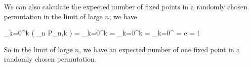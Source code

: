 We can also calculate the expected number of fixed points in a randomly chosen permutation in the limit of large $n$; we have

\bee
\sum_{k=0}^\infty k \left( \lim_{n \rightarrow \infty} P_{n,k} \right) = \sum_{k=0}^\infty k  =  \sum_{k=0}^\infty k  =  \sum_{k=0}^\infty {} =  e = 1
\eee

So in the limit of large $n$, we have an expected number of one fixed point in a randomly chosen permutation. 


